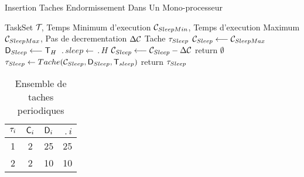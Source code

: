\begin{algorithm}
\caption{Insertion Taches Endormissement Dans Un Mono-processeur}
\label{edfup}
\begin{algorithmic}
\State TaskSet $\mathcal{T}_{}$, Temps Minimum d'execution $\mathcal{C}_{SleepMin}$, Temps d'execution Maximum $\mathcal{C}_{SleepMax}$, Pas de decrementation $\Delta \mathcal{C}_{}$
\State Tache $\tau_{Sleep}$
\State $\mathcal{C}_{Sleep}  \longleftarrow \mathcal{C}_{SleepMax}$ 
\State $\mathsf{D}_{Sleep}	\longleftarrow \mathsf{T}_{H}$ 
\State $\period{sleep} \longleftarrow \period{H}$ 
\State $\mathcal{C}_{Sleep} \longleftarrow \mathcal{C}_{Sleep} - \Delta \mathcal{C}_{}$ 
\EndWhile 
{}
\State return $\emptyset$
\EndIf
\State $\tau_{Sleep} \leftarrow Tache(\mathcal{C}_{Sleep},\mathsf{D}_{Sleep},\mathsf{T}_{sleep})$
\State return $\tau_{Sleep}$
\end{algorithmic}
\end{algorithm}

\begin{table}[!h]
\begin{center}
\begin{tabular}{|c|c|c|c|}
 \hline$\tau_{i}$ & $\mathsf{C}_{i}$ & $\mathsf{D}_{i}$ & $\period{i}$ \\ 
 \hline 1 & 2 & 25 & 25 \\ 
 \hline 2 & 2 & 10 & 10 \\ 
 \hline 
 \end{tabular}
\end{center}
\caption{Ensemble de taches periodiques} \label{tab:exempleedfmp}
\end{table}





